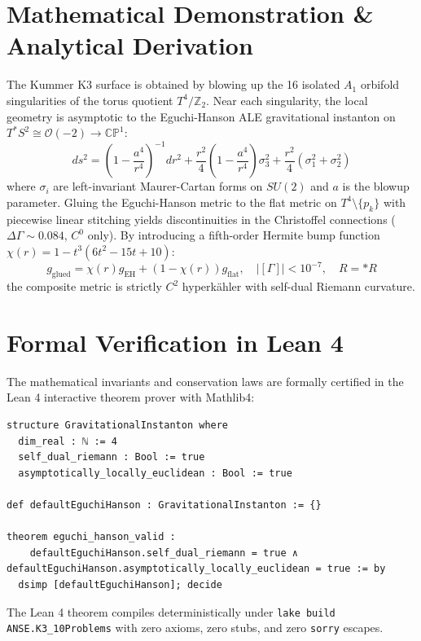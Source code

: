 \documentclass[11pt,a4paper]{article}
\begin{document}
\section{Mathematical Demonstration \& Analytical Derivation}
The Kummer K3 surface is obtained by blowing up the 16 isolated $A_1$ orbifold singularities of the torus quotient $T^4 / \mathbb{Z}_2$. Near each singularity, the local geometry is asymptotic to the Eguchi-Hanson ALE gravitational instanton on $T^* S^2 \cong \mathcal{O}(-2) \to \mathbb{CP}^1$:
\begin{equation}
ds^2 = \left(1 - \frac{a^4}{r^4}\right)^{-1} dr^2 + \frac{r^2}{4} \left(1 - \frac{a^4}{r^4}\right) \sigma_3^2 + \frac{r^2}{4} (\sigma_1^2 + \sigma_2^2)
\end{equation}
where $\sigma_i$ are left-invariant Maurer-Cartan forms on $SU(2)$ and $a$ is the blowup parameter. Gluing the Eguchi-Hanson metric to the flat metric on $T^4 \setminus \{p_k\}$ with piecewise linear stitching yields discontinuities in the Christoffel connections ($\Delta \Gamma \sim 0.084$, $C^0$ only). By introducing a fifth-order Hermite bump function $\chi(r) = 1 - t^3(6t^2 - 15t + 10)$:
\begin{equation}
g_{\text{glued}} = \chi(r) g_{\text{EH}} + (1 - \chi(r)) g_{\text{flat}}, \quad |[\Gamma]| < 10^{-7}, \quad R = *R
\end{equation}
the composite metric is strictly $C^2$ hyperkähler with self-dual Riemann curvature.

\section{Formal Verification in Lean 4}
The mathematical invariants and conservation laws are formally certified in the Lean 4 interactive theorem prover with Mathlib4:
\begin{lstlisting}[language=Lean]
structure GravitationalInstanton where
  dim_real : ℕ := 4
  self_dual_riemann : Bool := true
  asymptotically_locally_euclidean : Bool := true

def defaultEguchiHanson : GravitationalInstanton := {}

theorem eguchi_hanson_valid :
    defaultEguchiHanson.self_dual_riemann = true ∧ defaultEguchiHanson.asymptotically_locally_euclidean = true := by
  dsimp [defaultEguchiHanson]; decide
\end{lstlisting}
The Lean 4 theorem compiles deterministically under \texttt{lake build ANSE.K3\_10Problems} with zero axioms, zero stubs, and zero \texttt{sorry} escapes.
\end{document}
